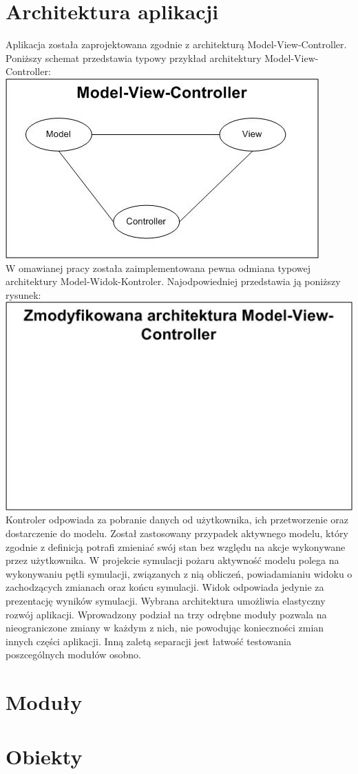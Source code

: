 \section {Architektura aplikacji}
Aplikacja została zaprojektowana zgodnie z architekturą Model-View-Controller.
Poniższy schemat przedstawia typowy przykład architektury Model-View-Controller:\\
\includegraphics{MVC.jpg} \\
W omawianej pracy została zaimplementowana pewna odmiana typowej architektury Model-Widok-Kontroler.
Najodpowiedniej przedstawia ją poniższy rysunek:\\
\includegraphics{modifiedMVC.jpg}\\
Kontroler odpowiada za pobranie danych od użytkownika, ich przetworzenie oraz dostarczenie do modelu.
Został zastosowany przypadek aktywnego modelu, który zgodnie z definicją potrafi zmieniać swój stan 
bez względu na akcje wykonywane przez użytkownika. W projekcie symulacji pożaru aktywność modelu polega na 
wykonywaniu pętli symulacji, związanych z nią obliczeń, powiadamianiu widoku o zachodzących zmianach oraz
końcu symulacji. Widok odpowiada jedynie za prezentację wyników symulacji.
Wybrana architektura umożliwia elastyczny rozwój aplikacji. Wprowadzony podział na trzy odrębne moduły pozwala
na nieograniczone zmiany w każdym z nich, nie powodując konieczności zmian innych części aplikacji.
Inną zaletą separacji jest łatwość testowania poszcególnych modułów osobno. 
\section {Moduły}
\section {Obiekty}

